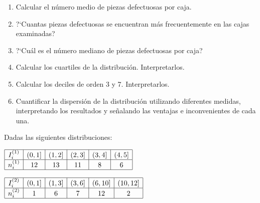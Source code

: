 \documentclass[hidequestions]{homework}
\begin{document}
	\begin{enumerate}
		\item Calcular el n{\'u}mero medio de piezas defectuosas por caja.
		\item ?`Cuantas piezas defectuosas se encuentran m{\'a}s frecuentemente en las
		cajas examinadas?
		\item ?`Cu{\'a}l es el n{\'u}mero mediano de piezas defectuosas por caja?
		\item Calcular los cuartiles de la distribuci{\'o}n. Interpretarlos.
		\item Calcular los deciles de orden 3 y 7. Interpretarlos.
		\item Cuantificar la dispersi{\'o}n de la  distribuci{\'o}n utilizando diferentes
		medidas, interpretando los resultados  y se{\~n}alando las ventajas e
		inconvenientes de cada una. \\
	\end{enumerate}
	\color{black}
	
	
	
	
	\problem
	Dadas las siguientes distribuciones:
	
	\begin{center}
		$\begin{array}{|c|c|c|c|c|c|} \hline
		I_{i}^{(1)} & (0,1] & (1,2] & (2,3] & (3,4] & (4,5] \\ \hline
		n_{i}^{(1)} & 12  & 13  &  11 &  8  &  6  \\ \hline
		\end{array}$
		
		$\begin{array}{|c|c|c|c|c|c|} \hline
		I_{i}^{(2)} & (0,1] & (1,3] & (3,6] & (6,10] & (10,12] \\ \hline
		n_{i}^{(2)} &  1   &  6  &  7  &  12  &  2  \\ \hline
		\end{array}$
	\end{center}
	
	
	
	
	
	
	
\end{document}
